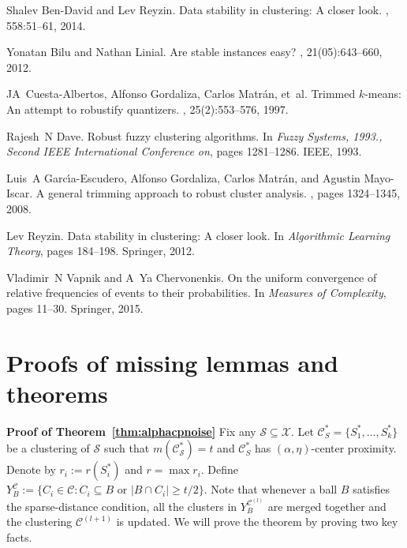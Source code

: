 \documentclass[orivec]{llncs}
\newcommand{\mc}{\mathcal}
\begin{document}
\begin{thebibliography}{10}
Shalev Ben-David and Lev Reyzin.
\newblock Data stability in clustering: A closer look.
, 558:51--61, 2014.

Yonatan Bilu and Nathan Linial.
\newblock Are stable instances easy?
, 21(05):643--660,
  2012.

JA~Cuesta-Albertos, Alfonso Gordaliza, Carlos Matr{\'a}n, et~al.
\newblock Trimmed $ k $-means: An attempt to robustify quantizers.
, 25(2):553--576, 1997.

Rajesh~N Dave.
\newblock Robust fuzzy clustering algorithms.
\newblock In {\em Fuzzy Systems, 1993., Second IEEE International Conference
  on}, pages 1281--1286. IEEE, 1993.

Luis~A Garc{\'\i}a-Escudero, Alfonso Gordaliza, Carlos Matr{\'a}n, and Agustin
  Mayo-Iscar.
\newblock A general trimming approach to robust cluster analysis.
, pages 1324--1345, 2008.


Lev Reyzin.
\newblock Data stability in clustering: A closer look.
\newblock In {\em Algorithmic Learning Theory}, pages 184--198. Springer, 2012.

Vladimir~N Vapnik and A~Ya Chervonenkis.
\newblock On the uniform convergence of relative frequencies of events to their
  probabilities.
\newblock In {\em Measures of Complexity}, pages 11--30. Springer, 2015.

\end{thebibliography}

%
% 


\appendix

\section{Proofs of missing lemmas and theorems}
\textbf{Proof of Theorem~\ref{thm:alphacpnoise}}
Fix any $\mc S \subseteq \mc X$. Let $\mc C^*_S = \{S_1^*, \ldots, S_k^*\}$ be a clustering of $\mc S$ such that $m(\mc C_{\mc S}^*) = t$ and $\mc C^*_S$ has $(\alpha, \eta)$-center proximity. Denote by $r_i := r(S_i^*)$ and $r = \max r_i$. Define $Y_B^{\mc C} := \{C_i \in \mc C : C_i \subseteq B \text{ or } |B \cap C_i| \ge t/2\}$. Note that whenever a ball $B$ satisfies the sparse-distance condition, all the clusters in $Y_{B}^{{\mc C}^{(l)}}$ are merged together and the clustering $\mc C^{(l+1)}$ is updated. We will prove the theorem by proving two key facts.
\end{document}

